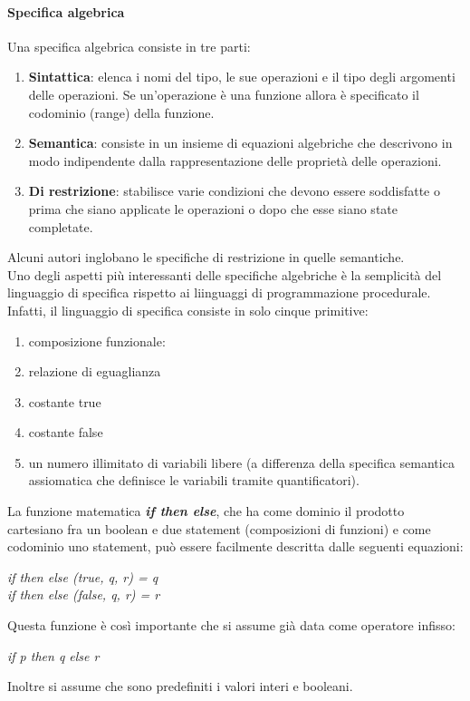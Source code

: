 \documentclass{article}
\begin{document}
	\paragraph{Specifica algebrica}
	Una specifica algebrica consiste in tre parti:
	\begin{enumerate}
		\item \textbf{Sintattica}: elenca i nomi del tipo, le sue operazioni e il tipo degli argomenti delle operazioni. Se un'operazione è una funzione allora è specificato il codominio (range) della funzione.
		\item \textbf{Semantica}: consiste in un insieme di equazioni algebriche che descrivono in modo indipendente dalla rappresentazione delle proprietà delle operazioni.
		\item \textbf{Di restrizione}: stabilisce varie condizioni che devono essere soddisfatte o prima che siano applicate le operazioni o dopo che esse siano state completate.
	\end{enumerate}
	Alcuni autori inglobano le specifiche di restrizione in quelle semantiche.
	\vspace{\baselineskip} \\
	Uno degli aspetti più interessanti delle specifiche algebriche è la semplicità del linguaggio di specifica rispetto ai liinguaggi di programmazione procedurale.\\
	Infatti, il linguaggio di specifica consiste in solo cinque primitive:
	\begin{enumerate}
		\item composizione funzionale:
		\item relazione di eguaglianza
		\item costante true
		\item costante false
		\item un numero illimitato di variabili libere (a differenza della specifica semantica assiomatica che definisce le variabili tramite quantificatori).
	\end{enumerate}
	La funzione matematica \textbf{\textit{if then else}}, che ha come dominio il prodotto cartesiano fra un boolean e due statement (composizioni di funzioni) e come codominio uno statement, può essere facilmente descritta dalle seguenti equazioni:
	\begin{center}
		\textit{if then else (true, q, r) = q} \\
		\textit{if then else (false, q, r) = r}
	\end{center}
	Questa funzione è così importante che si assume già data come operatore infisso:
	\begin{center}
		\textit{if p then q else r}
	\end{center}
	Inoltre si assume che sono predefiniti i valori interi e booleani.
	
\end{document}
